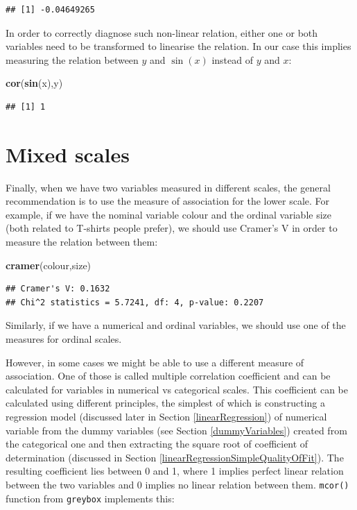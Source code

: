 \documentclass[
]{book}
\newenvironment{Shaded}{\begin{snugshade}}{\end{snugshade}}
\newcommand{\FunctionTok}[1]{\textcolor[rgb]{0.13,0.29,0.53}{\textbf{#1}}}
\newcommand{\NormalTok}[1]{#1}
\theoremstyle{definition}
\theoremstyle{definition}
\theoremstyle{definition}
\theoremstyle{definition}
\theoremstyle{remark}
\begin{document}
\begin{verbatim}
## [1] -0.04649265
\end{verbatim}

In order to correctly diagnose such non-linear relation, either one or both variables need to be transformed to linearise the relation. In our case this implies measuring the relation between \(y\) and \(\sin(x)\) instead of \(y\) and \(x\):

\begin{Shaded}
\begin{Highlighting}[]
\FunctionTok{cor}\NormalTok{(}\FunctionTok{sin}\NormalTok{(x),y)}
\end{Highlighting}
\end{Shaded}

\begin{verbatim}
## [1] 1
\end{verbatim}

\section{Mixed scales}\label{correlationsMixed}

Finally, when we have two variables measured in different scales, the general recommendation is to use the measure of association for the lower scale. For example, if we have the nominal variable colour and the ordinal variable size (both related to T-shirts people prefer), we should use Cramer's V in order to measure the relation between them:

\begin{Shaded}
\begin{Highlighting}[]
\FunctionTok{cramer}\NormalTok{(colour,size)}
\end{Highlighting}
\end{Shaded}

\begin{verbatim}
## Cramer's V: 0.1632
## Chi^2 statistics = 5.7241, df: 4, p-value: 0.2207
\end{verbatim}

Similarly, if we have a numerical and ordinal variables, we should use one of the measures for ordinal scales.

However, in some cases we might be able to use a different measure of association. One of those is called multiple correlation coefficient and can be calculated for variables in numerical vs categorical scales. This coefficient can be calculated using different principles, the simplest of which is constructing a regression model (discussed later in Section \ref{linearRegression}) of numerical variable from the dummy variables (see Section \ref{dummyVariables}) created from the categorical one and then extracting the square root of coefficient of determination (discussed in Section \ref{linearRegressionSimpleQualityOfFit}). The resulting coefficient lies between 0 and 1, where 1 implies perfect linear relation between the two variables and 0 implies no linear relation between them. \texttt{mcor()} function from \texttt{greybox} implements this:
\end{document}

